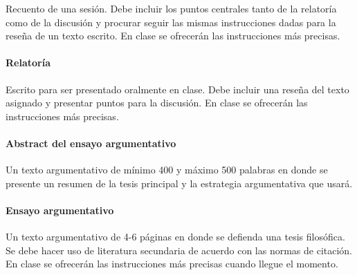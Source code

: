 \documentclass[]{article}
\let\oldparagraph\paragraph
\renewcommand{\paragraph}[1]{\oldparagraph{#1}\mbox{}}
\begin{document}
Recuento de una sesión. Debe incluir los puntos centrales tanto de la
relatoría como de la discusión y  procurar seguir las mismas
instrucciones dadas para la reseña de un texto escrito. En clase se
ofrecerán las instrucciones más precisas.

\paragraph{Relatoría}\label{relatoruxeda}

Escrito para ser presentado oralmente en clase. Debe incluir una reseña
del texto asignado y presentar puntos para la discusión. En clase se
ofrecerán las instrucciones más precisas.

\paragraph{Abstract del ensayo
argumentativo}\label{abstract-del-ensayo-argumentativo}

Un texto argumentativo de mínimo 400 y máximo 500 palabras en donde se
presente un resumen de la tesis principal y la estrategia argumentativa
que usará.

\paragraph{Ensayo argumentativo}\label{ensayo-argumentativo}

Un texto argumentativo de 4-6 páginas en donde se defienda una tesis
filosófica. Se debe hacer uso de literatura secundaria de acuerdo con
las normas de citación. En clase se ofrecerán las instrucciones más
precisas cuando llegue el momento.
\end{document}
